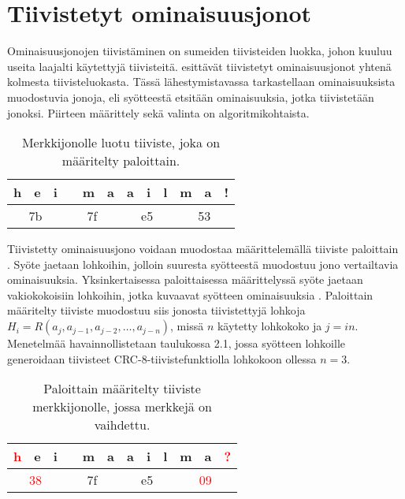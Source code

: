 \section{Tiivistetyt ominaisuusjonot}

Ominaisuusjonojen tiivistäminen on sumeiden tiivisteiden luokka,
johon kuuluu useita laajalti käytettyjä tiivisteitä. \textcite{martin-perez21}
esittävät tiivistetyt ominaisuusjonot yhtenä kolmesta tiivisteluokasta.
Tässä lähestymistavassa tarkastellaan ominaisuuksista
muodostuvia jonoja, eli syötteestä etsitään ominaisuuksia,
jotka tiivistetään jonoksi. Piirteen määrittely sekä
valinta on algoritmikohtaista.

\begin{table}[h]
   \centering
   \caption{Merkkijonolle luotu tiiviste, joka on määritelty paloittain.}
   \begin{tabular}{|c|c|c|c|c|c|c|c|c|c|c|c|} 
      \hline
      h & e & i                  &  & m & a                & a & i & l               & m & a & !                \\ 
      \hline
      \multicolumn{3}{|c|}{7b}   & \multicolumn{3}{c|}{7f} & \multicolumn{3}{c|}{e5} & \multicolumn{3}{c|}{53}  \\
      \hline
   \end{tabular}
\end{table}

Tiivistetty ominaisuusjono voidaan muodostaa määrittelemällä
tiiviste paloittain \parencite{martin-perez21}. Syöte jaetaan lohkoihin,
jolloin suuresta syötteestä muodostuu jono vertailtavia ominaisuuksia. 
Yksinkertaisessa paloittaisessa määrittelyssä syöte jaetaan
vakiokokoisiin lohkoihin, jotka kuvaavat syötteen ominaisuuksia
\parencite{kornblum06}.
Paloittain määritelty tiiviste muodostuu siis jonosta tiivistettyjä
lohkoja $H_i = R(a_j, a_{j - 1}, a_{j - 2}, \dots, a_{j - n})$,
missä $n$ käytetty lohkokoko ja $j = in$. Menetelmää havainnollistetaan
taulukossa 2.1, jossa syötteen lohkoille generoidaan tiivisteet
CRC-8-tiivistefunktiolla lohkokoon ollessa $n = 3$.

\begin{table}[h]
   \centering
   \caption{Paloittain määritelty tiiviste merkkijonolle, jossa merkkejä
      on vaihdettu.}
   \begin{tabular}{|c|c|c|c|c|c|c|c|c|c|c|c|} 
      \hline
      \textcolor{red}{h} & e & i                  &  & m & a                & a & i & l               & m & a & \textcolor{red}{?}                \\ 
      \hline
      \multicolumn{3}{|c|}{\textcolor{red}{38}}   & \multicolumn{3}{c|}{7f} & \multicolumn{3}{c|}{e5} & \multicolumn{3}{c|}{\textcolor{red}{09}}  \\
      \hline
   \end{tabular}
\end{table}

